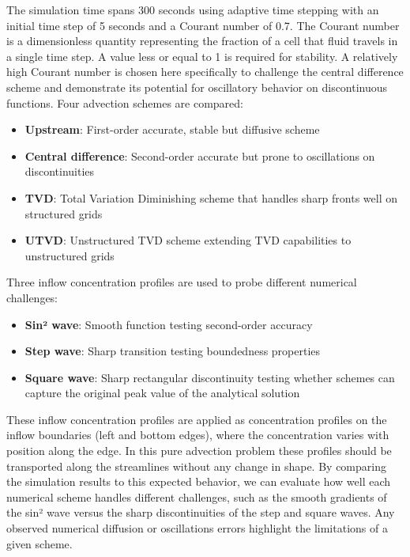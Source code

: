 \noindent The simulation time spans 300 seconds using adaptive time stepping with an initial time step of 5 seconds and a Courant number of 0.7. The Courant number is a dimensionless quantity representing the fraction of a cell that fluid travels in a single time step. A value less or equal to 1 is required for stability. A relatively high Courant number is chosen here specifically to challenge the central difference scheme and demonstrate its potential for oscillatory behavior on discontinuous functions. Four advection schemes are compared:
\begin{itemize}
\item \textbf{Upstream}: First-order accurate, stable but diffusive scheme
\item \textbf{Central difference}: Second-order accurate but prone to oscillations on discontinuities
\item \textbf{TVD}: Total Variation Diminishing scheme that handles sharp fronts well on structured grids
\item \textbf{UTVD}: Unstructured TVD scheme extending TVD capabilities to unstructured grids
\end{itemize}

\noindent Three inflow concentration profiles are used to probe different numerical challenges:
\begin{itemize}
\item \textbf{Sin² wave}: Smooth function testing second-order accuracy
\item \textbf{Step wave}: Sharp transition testing boundedness properties
\item \textbf{Square wave}: Sharp rectangular discontinuity testing whether schemes can capture the original peak value of the analytical solution
\end{itemize}

\noindent These inflow concentration profiles are applied as concentration profiles on the inflow boundaries (left and bottom edges), where the concentration varies with position along the edge. In this pure advection problem these profiles should be transported along the streamlines without any change in shape. By comparing the simulation results to this expected behavior, we can evaluate how well each numerical scheme handles different challenges, such as the smooth gradients of the sin² wave versus the sharp discontinuities of the step and square waves. Any observed numerical diffusion or oscillations errors highlight the limitations of a given scheme.


